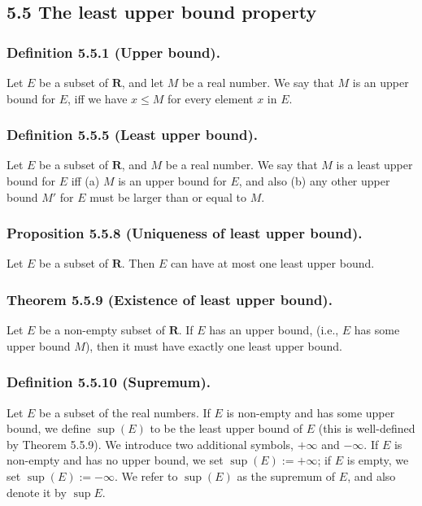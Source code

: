 \documentclass[12pt, letter]{article}
\begin{document}
\subsection*{5.5 The least upper bound property}
\subsubsection*{Definition 5.5.1 (Upper bound).}
Let $E$ be a subset of $\mathbf{R}$, and let $M$ be a real number. We say that $M$ is an upper bound for $E$, iff we have $x\leq M$ for every element $x$ in $E$.
\subsubsection*{Definition 5.5.5 (Least upper bound).}
Let $E$ be a subset of $\mathbf{R}$, and $M$ be a real number. We say that $M$ is a least upper bound for $E$ iff (a) $M$ is an upper bound for $E$, and also (b)
any other upper bound $M'$ for $E$ must be larger than or equal to $M$.
\subsubsection*{Proposition 5.5.8 (Uniqueness of least upper bound).}
Let $E$ be a subset of $\mathbf{R}$. Then $E$ can have at most one least upper bound.
\subsubsection*{Theorem 5.5.9 (Existence of least upper bound).}
Let $E$ be a non-empty subset of $\mathbf{R}$. If $E$ has an upper bound, (i.e., $E$ has some upper bound $M$), then it must have exactly one least upper bound.
\subsubsection*{Definition 5.5.10 (Supremum).}
Let $E$ be a subset of the real numbers. If $E$ is non-empty and has some upper bound, we define $\sup(E)$ to be the least upper bound of $E$ (this is well-defined by Theorem 5.5.9).
We introduce two additional symbols, $+\infty$ and $-\infty$. If $E$ is non-empty and has no upper bound, we set $\sup(E):=+\infty$; if $E$ is empty, we set $\sup(E):=-\infty$.
We refer to $\sup(E)$ as the supremum of $E$, and also denote it by $\sup E$.
\end{document}
